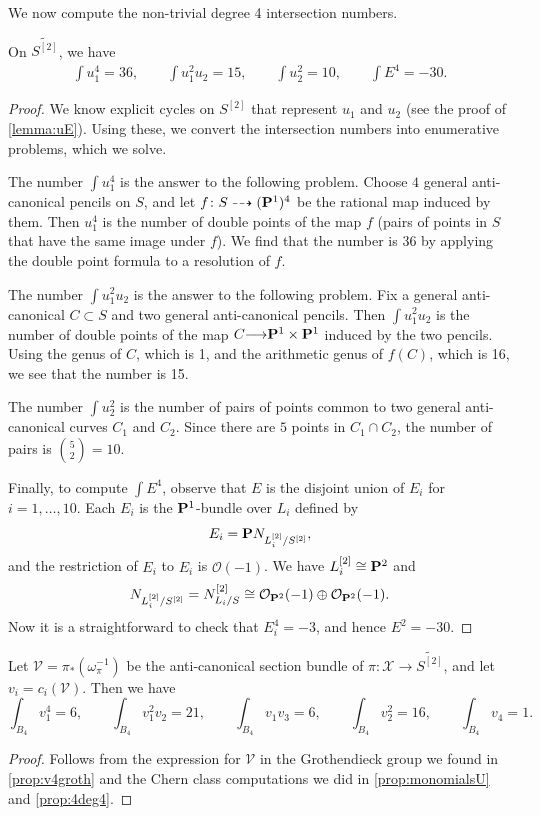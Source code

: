 \documentclass[reqno]{amsart}
\renewcommand{\to}{{\longrightarrow}}
\renewcommand {\P}{{\bf P}}
\numberwithin{equation}{section}
\renewcommand{\O}{\mathcal{O}}
\begin{document}
We now compute the non-trivial degree 4 intersection numbers.
\begin{proposition}
  \label{prop:monomialsU}
  On $\widetilde{S^{[2]}}$, we have
  \[
    \begin{split}
      \int u_{1}^{4} = 36, \qquad   \int u_{1}^{2}u_{2} = 15, \qquad
      \int  u_{2}^{2} = 10, \qquad    \int  E^{4} = -30.
    \end{split}
\]
\end{proposition}
\begin{proof}
  We know explicit cycles on $S^{[2]}$ that represent $u_1$ and $u_2$ (see the proof of \autoref{lemma:uE}).
  Using these, we convert the intersection numbers into enumerative problems, which we solve.

  The number $\int u_1^4$ is the answer to the following problem.
  Choose $4$ general anti-canonical pencils on $S$, and let $f \colon S \dashrightarrow (\P^1)^4$ be the rational map induced by them.
  Then $u_1^4$ is the number of double points of the map $f$ (pairs of points in $S$ that have the same image under $f$).
  We find that the number is 36 by applying the double point formula \cite[Theorem~2]{ful:78} to a resolution of $f$.

  The number $\int u_{1}^{2}u_{2}$ is the answer to the following problem.
  Fix a general anti-canonical $C \subset S$ and two general anti-canonical pencils.
  Then $\int u_1^2u_2$ is the number of double points of the map $C \to \P^1 \times \P^1$ induced by the two pencils.
  Using the genus of $C$, which is 1, and the arithmetic genus of $f(C)$, which is 16, we see that the number is 15.

  The number $\int u_2^2$ is the number of pairs of points common to two general anti-canonical curves $C_1$ and $C_2$.
  Since there are $5$ points in $C_1 \cap C_2$, the number of pairs is ${5 \choose 2} = 10$.

  Finally, to compute $\int E^4$, observe that $E$ is the disjoint union of $E_i$ for $i = 1, \dots, 10$.
  Each $E_i$ is the $\P^1$-bundle over $L_i$ defined by
  \[ E_i = \P N_{L_i^{[2]}/S^{[2]}},\]
  and the restriction of $E_i$ to $E_i$ is $\O(-1)$.
  We have $L_i^{[2]} \cong \P^2$ and
  \[ N_{L_i^{[2]}/S^{[2]}} = N_{L_i/S}^{[2]} \cong \O_{\P^2}(-1) \oplus \O_{\P^2}(-1).\]
  Now it is a straightforward to check that $E_i^4 = -3$, and hence $E^2 = -30$.
\end{proof}
\begin{proposition}\label{prop:4deg4}
  Let $\mathcal{V} = \pi_*\left(  \omega_{\pi}^{-1} \right)$ be the anti-canonical section bundle of $\pi \colon \mathcal{X} \to \widetilde{S^{[2]}}$,
  and let $v_i = c_i(\mathcal{V})$.
  Then we have
  \[
    \int_{B_{4}} v_{1}^{4} = 6, \qquad
    \int_{B_{4}} v_{1}^{2}v_{2} = 21, \qquad
      \int_{B_{4}} v_{1}v_{3} = 6, \qquad
      \int_{B_{4}} v_{2}^{2} = 16, \qquad
      \int_{B_{4}} v_{4} = 1.
  \]
\end{proposition}
\begin{proof}
  Follows from the expression for $\mathcal{V}$ in the Grothendieck group we found in \autoref{prop:v4groth} and the Chern class computations we did in \autoref{prop:monomialsU} and \autoref{prop:4deg4}.
\end{proof}
\end{document}
